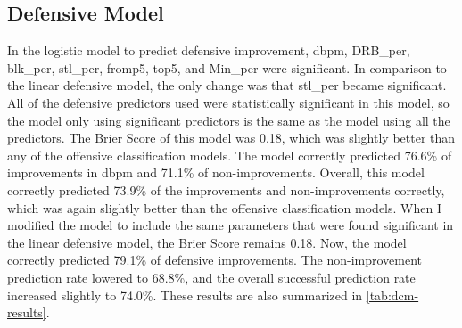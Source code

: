 \documentclass[12pt]{article}
\begin{document}
\subsection{Defensive Model}
\label{subsec:dcm}
In the logistic model to predict defensive improvement, dbpm, DRB\_per, blk\_per, stl\_per, fromp5, top5, and Min\_per were significant. In comparison to the linear defensive model, the only change was that stl\_per became significant. All of the defensive predictors used were statistically significant in this model, so the model only using significant predictors is the same as the model using all the predictors. The Brier Score of this model was 0.18, which was slightly better than any of the offensive classification models. The model correctly predicted 76.6\% of improvements in dbpm and 71.1\% of non-improvements. Overall, this model correctly predicted 73.9\% of the improvements and non-improvements correctly, which was again slightly better than the offensive classification models. When I modified the model to include the same parameters that were found significant in the linear defensive model, the Brier Score remains 0.18. Now, the model correctly predicted 79.1\% of defensive improvements. The non-improvement prediction rate lowered to 68.8\%, and the overall successful prediction rate increased slightly to 74.0\%. These results are also summarized in \autoref{tab:dcm-results}.

\begin{table}[tbp]
\caption{Offensive Classification Model Evaluators}
\centering
{}
\label{tab:dcm-results}
\end{table}
\end{document}
